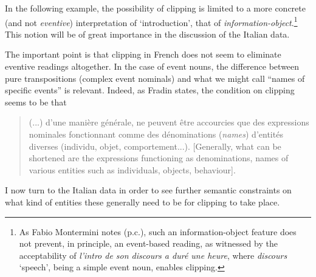 \documentclass[output=paper]{langsci/langscibook}
\begin{document}
In the following example, the possibility of clipping is limited to a
more concrete (and not \emph{eventive}) interpretation of
`introduction', that of \emph{information-object}.\footnote{As Fabio
  Montermini notes (p.c.), such an information-object feature does not
  prevent, in principle, an event-based reading, as witnessed by the
  acceptability of \emph{l'intro de son discours a duré une heure},
  where \emph{discours} `speech', being a simple event noun, enables
  clipping.} This notion will be of great importance in the discussion of
the Italian data.

\begin{exe}
\ex\label{ex:Stekauer:7}
\begin{xlist}
\end{xlist}
\end{exe}

The important point is that clipping in French does not seem to
eliminate eventive readings altogether. In the case of event nouns, the
difference between pure transpositions (complex event nominals) and what
we might call ``names of specific events'' is relevant. Indeed, as
Fradin states, the  condition on clipping seems  to be that

\begin{quote}

(...) d'une manière générale, ne peuvent être accourcies que des
expressions nominales fonctionnant comme des dénominations
(\emph{names}) d'entités diverses (individu, objet, comportement...).
{[}Generally, what can be shortened are the expressions functioning as
denominations, names of various entities such as individuals, objects,
behaviour{]}. \citep[250]{Fradin2003}%
\end{quote}

I now turn to the Italian data in order to see further semantic
constraints on what kind of entities these generally need to be for
clipping to take
place.
\end{document}
